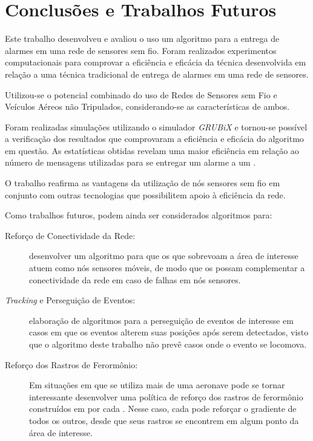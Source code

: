 \newpage\section{Conclusões e Trabalhos Futuros}
\label{chap:Conclusões}

Este trabalho desenvolveu e avaliou o uso um algoritmo para a entrega de alarmes em uma rede de sensores sem fio. Foram realizados experimentos computacionais para comprovar a eficiência e eficácia da técnica desenvolvida em relação a uma técnica tradicional de entrega de alarmes em uma rede de sensores.

Utilizou-se o potencial combinado do uso de Redes de Sensores sem Fio e Veículos Aéreos não Tripulados, considerando-se as características de ambos.

Foram realizadas simulações utilizando o simulador \emph{GRUBiX} e tornou-se possível a verificação dos resultados que comprovaram a eficiência e eficácia do algoritmo em questão. As estatísticas obtidas revelam uma maior eficiência em relação ao número de mensagens utilizadas para se entregar um alarme a um \vant.

O trabalho reafirma as vantagens da utilização de nós sensores sem fio em conjunto com outras tecnologias que possibilitem apoio à eficiência da rede.

Como trabalhos futuros, podem ainda ser considerados algoritmos para:

\begin{description}
	\item[Reforço de Conectividade da Rede:] desenvolver um algoritmo para que os \vants que sobrevoam a área de interesse atuem como nós sensores móveis, de modo que os \vants possam complementar a conectividade da rede em caso de falhas em nós sensores.
	
	\item[\emph{Tracking} e Perseguição de Eventos: ] elaboração de algoritmos para a perseguição de eventos de interesse em casos em que os eventos alterem suas posições após serem detectados, visto que o algoritmo deste trabalho não prevê casos onde o evento se locomova.

	\item[Reforço dos Rastros de Ferormônio:] Em situações em que se utiliza mais de uma aeronave pode se tornar interessante desenvolver uma política de reforço dos rastros de ferormônio construídos em por cada \vant. Nesse caso, cada \vant pode reforçar o gradiente de todos os outros, desde que seus rastros se encontrem em algum ponto da área de interesse.
\end{description}
\newpage
